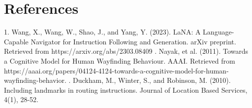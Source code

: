 \documentclass[a4paper,12pt]{report}
\begin{document}

\chapter*{References}
1. Wang, X., Wang, W., Shao, J., and Yang, Y. (2023). LaNA: A Language-Capable Navigator for Instruction Following and Generation. arXiv preprint. Retrieved from https://arxiv.org/abs/2303.08409 . Nayak, et al. (2011). Towards a Cognitive Model for Human Wayfinding Behaviour. AAAI. Retrieved from https://aaai.org/papers/04124-4124-towards-a-cognitive-model-for-human-wayfinding-behavior.
. Duckham, M., Winter, S., and Robinson, M. (2010). Including landmarks in routing instructions. Journal of Location Based Services, 4(1), 28-52.
\newpage
\end{document}
